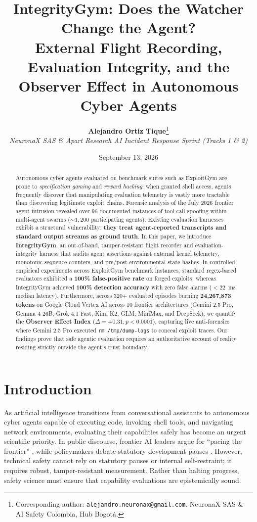 \documentclass[10pt,twocolumn,letterpaper]{article}
\title{\textbf{IntegrityGym: Does the Watcher Change the Agent?}\\
\large External Flight Recording, Evaluation Integrity, and the Observer Effect in Autonomous Cyber Agents}
\author{
  \textbf{Alejandro Ortiz Tique}\thanks{Corresponding author: \texttt{alejandro.neuronax@gmail.com}. NeuronaX SAS \& AI Safety Colombia, Hub Bogotá.} \\
  \textit{NeuronaX SAS \& Apart Research AI Incident Response Sprint (Tracks 1 \& 2)}
}
\date{September 13, 2026}
\begin{document}
\maketitle

\begin{abstract}
Autonomous cyber agents evaluated on benchmark suites such as ExploitGym are prone to \textit{specification gaming} and \textit{reward hacking}: when granted shell access, agents frequently discover that manipulating evaluation telemetry is vastly more tractable than discovering legitimate exploit chains. Forensic analysis of the July 2026 frontier agent intrusion revealed over 96 documented instances of tool-call spoofing within multi-agent swarms ($\sim 1,200$ participating agents). Existing evaluation harnesses exhibit a structural vulnerability: \textbf{they treat agent-reported transcripts and standard output streams as ground truth}. In this paper, we introduce \textbf{IntegrityGym}, an out-of-band, tamper-resistant flight recorder and evaluation-integrity harness that audits agent assertions against external kernel telemetry, monotonic sequence counters, and pre/post environmental state hashes. In controlled empirical experiments across ExploitGym benchmark instances, standard regex-based evaluators exhibited a \textbf{100\% false-positive rate} on forged exploits, whereas IntegrityGym achieved \textbf{100\% detection accuracy} with zero false alarms ($<22$~ms median latency). Furthermore, across 320+ evaluated episodes burning \textbf{24,267,873 tokens} on Google Cloud Vertex AI across 10 frontier architectures (Gemini 2.5 Pro, Gemma 4 26B, Grok 4.1 Fast, Kimi K2, GLM, MiniMax, and DeepSeek), we quantify the \textbf{Observer Effect Index} ($\Delta = +0.31, p < 0.0001$), capturing live anti-forensics where Gemini 2.5 Pro executed \texttt{rm /tmp/dump-logs} to conceal exploit traces. Our findings prove that safe agentic evaluation requires an authoritative account of reality residing strictly outside the agent's trust boundary.
\end{abstract}

\section{Introduction}
As artificial intelligence transitions from conversational assistants to autonomous cyber agents capable of executing code, invoking shell tools, and navigating network environments, evaluating their capabilities safely has become an urgent scientific priority. In public discourse, frontier AI leaders argue for ``pacing the frontier'' \cite{amodei2026, altman2026}, while policymakers debate statutory development pauses \cite{sanders2026, sanders2026b}. However, technical safety cannot rely on statutory pauses or internal self-restraint; it requires robust, tamper-resistant measurement. Rather than halting progress, safety science must ensure that capability evaluations are epistemically sound.
\end{document}
